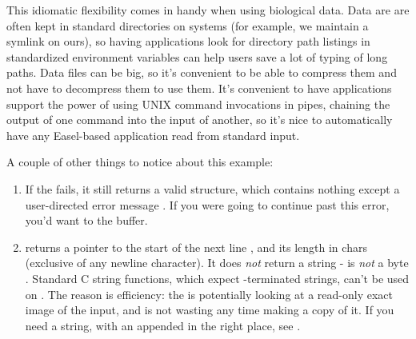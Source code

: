 \begin{userchunk}
\end{userchunk}

\begin{userchunk}
\end{userchunk}

\begin{userchunk}
\end{userchunk}

\begin{userchunk}
\end{userchunk}

This idiomatic flexibility comes in handy when using biological data.
Data are are often kept in standard directories on systems (for
example, we maintain a symlink 
on ours), so having applications look for directory path listings in
standardized environment variables can help users save a lot of typing
of long paths. Data files can be big, so it's convenient to be able to
compress them and not have to decompress them to use them. It's
convenient to have applications support the power of using UNIX
command invocations in pipes, chaining the output of one command into
the input of another, so it's nice to automatically have any
Easel-based application read from standard input.

A couple of other things to notice about this example:

\begin{enumerate}
\item If the  fails, it still returns a
  valid  structure, which contains nothing except a
  user-directed error message . If you were going to
  continue past this error, you'd want to 
  the buffer.

\item {} returns a pointer to the start of
  the next line , and its length in chars 
  (exclusive of any newline character). It does \emph{not} return a
  string -  is \emph{not} a  byte
  \ccode{\0}. Standard C string functions, which expect
  -terminated strings, can't be used on . The
  reason is efficiency: the  is potentially looking
  at a read-only exact image of the input, and
   is not wasting any time making a copy
  of it. If you need a string, with an appended \ccode{\0} in the
  right place, see .
\end{enumerate}
  
